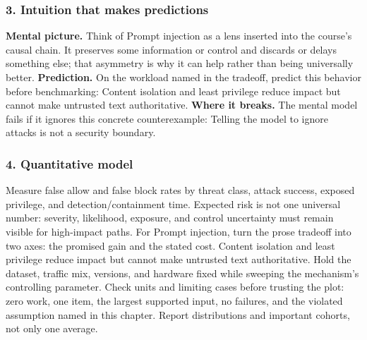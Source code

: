 \subsubsection*{3. Intuition that makes predictions}
\textbf{Mental picture.} Think of Prompt injection as a lens inserted into the course's causal chain. It preserves some information or control and discards or delays something else; that asymmetry is why it can help rather than being universally better.
\textbf{Prediction.} On the workload named in the tradeoff, predict this behavior before benchmarking: Content isolation and least privilege reduce impact but cannot make untrusted text authoritative.
\textbf{Where it breaks.} The mental model fails if it ignores this concrete counterexample: Telling the model to ignore attacks is not a security boundary.
\subsubsection*{4. Quantitative model}
Measure false allow and false block rates by threat class, attack success, exposed privilege, and detection/containment time. Expected risk is not one universal number: severity, likelihood, exposure, and control uncertainty must remain visible for high-impact paths.
For Prompt injection, turn the prose tradeoff into two axes: the promised gain and the stated cost. Content isolation and least privilege reduce impact but cannot make untrusted text authoritative. Hold the dataset, traffic mix, versions, and hardware fixed while sweeping the mechanism's controlling parameter.
Check units and limiting cases before trusting the plot: zero work, one item, the largest supported input, no failures, and the violated assumption named in this chapter. Report distributions and important cohorts, not only one average.
